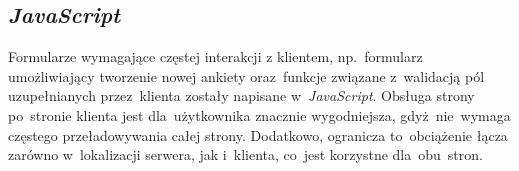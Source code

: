 \subsection{\textit{JavaScript}}
\label{Chapter63c}

Formularze wymagające częstej interakcji z klientem, np.~formularz umożliwiający tworzenie nowej ankiety oraz~funkcje związane z~walidacją pól uzupełnianych przez~klienta zostały napisane w~\textit{JavaScript}. Obsługa strony po~stronie klienta jest dla~użytkownika znacznie wygodniejsza, gdyż~nie~wymaga częstego przeładowywania całej strony. Dodatkowo, ogranicza to~obciążenie łącza zarówno w~lokalizacji serwera, jak i~klienta, co~jest korzystne dla~obu~stron.